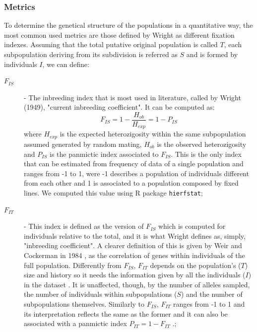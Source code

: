 \documentclass[a4paper, 12pt]{report}
\begin{document}
\subsubsection{Metrics}
To determine the genetical structure of the populations in a quantitative way, the most common used metrics are those defined by Wright \parencite{wrightGeneticalStructurePopulations1949} as different fixation indexes. Assuming that the total putative original population is called $T$, each subpopulation deriving from its subdivision is referred as $S$ and is formed by individuals $I$, we can define:
\vspace{-1.5em}
\begin{description}
	\item[\textbf{$F_{IS}$}] - The inbreeding index that is most used in literature, called by Wright (1949), "current inbreeding coefficient". It can be computed as:
	\begin{equation}
		F_{IS} = 1 - \dfrac{H_{ob}}{H_{exp}} = 1 - P_{IS}
	\end{equation}
	where $H_{exp}$ is the expected heterozigosity within the same subpopulation assumed generated by random mating, $H_{ob}$ is the observed heterozigosity and $P_{IS}$ is the panmictic index associated to $F_{IS}$. This is the only index that can be estimated from frequency of data of a single population \parencite{weirEstimatingFStatisticsAnalysis1984} and ranges from -1 to 1, were -1 describes a population of individuals different from each other and 1 is associated to a population composed by fixed lines. We computed this value using R package \texttt{hierfstat};
	\item[\textbf{$F_{IT}$}] - This index is defined as the version of $F_{IS}$ which is computed for individuals relative to the total, and it is what Wright defines as, simply,  "inbreeding coefficient". A clearer definition of this is given by Weir and Cockerman in 1984 \parencite{weirEstimatingFStatisticsAnalysis1984}, as the correlation of genes within individuals of the full population. Differently from $F_{IS}$, $F_{IT}$ depends on the population's ($T$) size and history so it needs the information given by all the individuals ($I$) in the dataset \parencite{weirEstimatingFStatisticsAnalysis1984}. It is unaffected, though, by the number of alleles sampled, the number of individuals within subpopulations ($S$) and the number of subpopulations themselves. Similarly to $F_{IS}$, $F_{IT}$ ranges from -1 to 1 and its interpretation reflects the same as the former and it can also be associated with a panmictic index $P_{IT} = 1 - F_{IT}$ \parencite{wrightGeneticalStructurePopulations1949}.;

\end{description}
\end{document}
